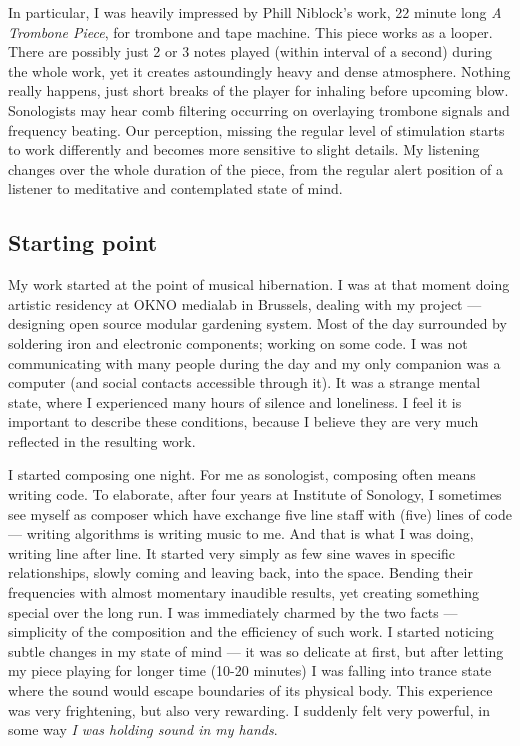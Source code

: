 \documentclass[12pt,a4paper,oneside]{report}
\begin{document}
In particular, I was heavily impressed by Phill Niblock's work, 22 minute long \emph{A Trombone Piece}, for trombone and tape machine. This piece works as a looper. There are possibly just 2 or 3 notes played (within interval of a second) during the whole work, yet it creates astoundingly heavy and dense atmosphere. Nothing really happens, just short breaks of the player for inhaling before upcoming blow. Sonologists may hear comb filtering occurring on overlaying trombone signals and frequency beating. Our perception, missing the regular level of stimulation starts to work differently and becomes more sensitive to slight details. My listening changes over the whole duration of the piece, from the regular alert position of a listener to meditative and contemplated state of mind. 

\subsection{Starting point}

My work started at the point of musical hibernation. I was at that moment doing artistic residency at OKNO medialab in Brussels, dealing with my project --- designing open source modular gardening system. Most of the day surrounded by soldering iron and electronic components; working on some code. I was not communicating with many people during the day and my only companion was a computer (and social contacts accessible through it). It was a strange mental state, where I experienced many hours of silence and loneliness. I feel it is important to describe these conditions, because I believe they are very much reflected in the resulting work. 

I started composing one night. For me as sonologist, composing often means writing code. To elaborate, after four years at Institute of Sonology, I sometimes see myself as composer which have exchange five line staff with (five) lines of code --- writing algorithms is writing music to me. And that is what I was doing, writing line after line. It started very simply as few sine waves in specific relationships, slowly coming and leaving back, into the space. Bending their frequencies with almost momentary inaudible results, yet creating something special over the long run. I was immediately charmed by the two facts --- simplicity of the composition and the efficiency of such work. I started noticing subtle changes in my state of mind --- it was so delicate at first, but after letting my piece playing for longer time (10-20 minutes) I was falling into trance state where the sound would escape boundaries of its physical body. This experience was very frightening, but also very rewarding. I suddenly felt very powerful, in some way \emph{I was holding sound in my hands}. 
\end{document}
